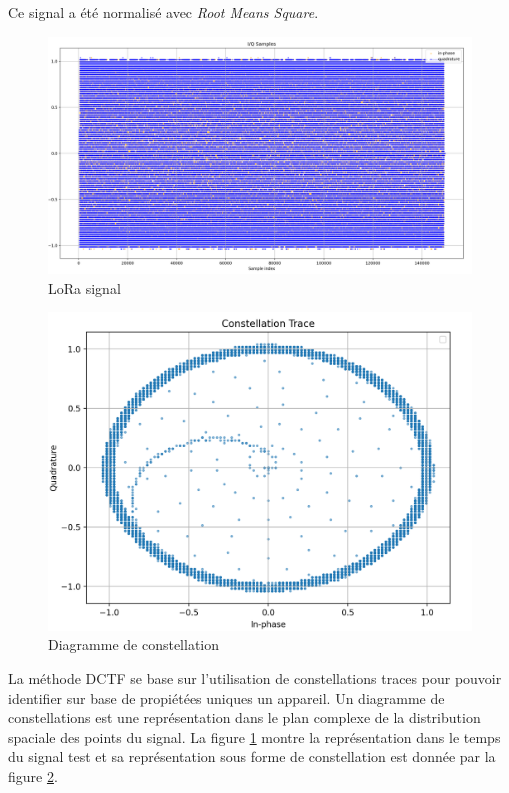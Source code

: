 \vspace{0.1cm}

Ce signal a été normalisé avec \textit{Root Means Square}.



\begin{figure}[h]
\centering

\includegraphics[scale=0.12]{images/dctf2.png}
\caption{LoRa signal}\label{term313}
\end{figure}


\begin{figure}[h]
\centering

\includegraphics[scale=0.25]{images/dctf1.png}
\caption{Diagramme de constellation}\label{term314}
\end{figure}


La méthode DCTF se base sur l'utilisation de constellations traces pour pouvoir identifier sur base de propiétées uniques un appareil. Un diagramme de constellations est une représentation dans le plan complexe de la distribution spaciale des points du signal. La figure \ref{term313} montre la représentation dans le temps du signal test et sa représentation sous forme de constellation est donnée par la figure \ref{term314}.




